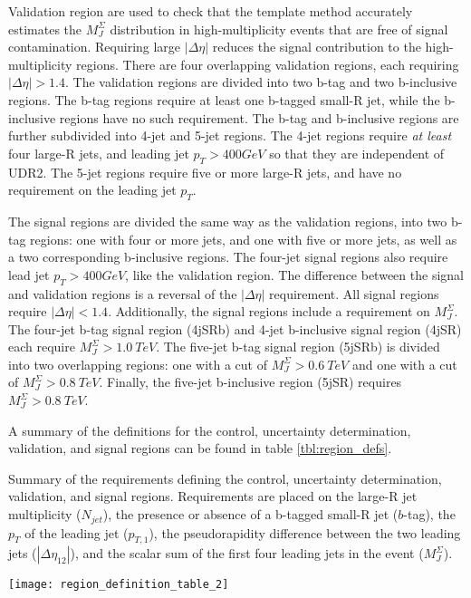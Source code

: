 Validation region are used to check that the template method
accurately estimates the $M_J^{\Sigma}$ distribution in
high-multiplicity events that are free of signal
contamination. Requiring large $|\Delta\eta|$ reduces the signal
contribution to the high-multiplicity regions. There are four
overlapping validation regions, each requiring $|\Delta\eta| >
1.4$. The validation regions are divided into two b-tag and two
b-inclusive regions. The b-tag regions require at least one b-tagged
small-R jet, while the b-inclusive regions have no such
requirement. The b-tag and b-inclusive regions are further subdivided
into 4-jet and 5-jet regions. The 4-jet regions require \textit{at
  least} four large-R jets, and leading jet $p_T>400GeV$ so that
they are independent of UDR2. The 5-jet regions require five or more
large-R jets, and have no requirement on the leading jet $p_T$. 

The signal regions are divided the same way as the validation regions,
into two b-tag regions: one with four or more jets, and one with five
or more jets, as well as a two corresponding b-inclusive regions. The
four-jet signal regions also require lead jet $p_T>400GeV$, like the
validation region. The difference between the signal and validation
regions is a reversal of the $|\Delta\eta|$ requirement. All signal
regions require $|\Delta\eta|<1.4$. Additionally, the signal regions
include a requirement on $M_J^{\Sigma}$. The four-jet b-tag signal region
(4jSRb) and 4-jet b-inclusive signal region (4jSR) each require
$M_J^{\Sigma} > 1.0~TeV$. The five-jet b-tag signal region (5jSRb) is
divided into two overlapping regions: one with a cut of
$M_J^{\Sigma}>0.6~TeV$ and one with a cut of
$M_J^{\Sigma}>0.8~TeV$. Finally, the five-jet b-inclusive region
(5jSR) requires $M_J^{\Sigma}>0.8~TeV$.

A summary of the definitions for the control, uncertainty
determination, validation, and signal regions can be found in table \ref{tbl:region_defs}.

\begin{table}
  \caption{Summary of the requirements defining the control,
    uncertainty determination, validation, and signal
    regions. Requirements are placed on the large-R jet multiplicity
    ($N_{jet}$), the presence or absence of a b-tagged small-R jet
    ($b$-tag), the $p_T$ of the leading jet ($p_{T,1}$), the
    pseudorapidity difference between the two leading jets
    ($|\Delta\eta_{12}|$), and the scalar sum of the first four
    leading jets in the event ($M_J^{\Sigma}$).}
  \label{tbl:region_defs}
  \texttt{[image: region\_definition\_table\_2]}
\end{table}

